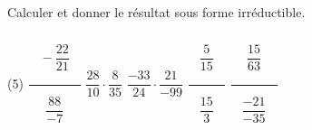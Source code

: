 \documentclass[a4paper,12pt]{report}
\begin{document}
\begin{auto}Calculer et donner le résultat sous forme irréductible.

\begin{tasks}(5)
	\task $\dfrac{\phantom{\dfrac{(_(^(}{(_(^(}}-\dfrac{22}{21}\phantom{\dfrac{(_(^(}{(_(^(}}}{\phantom{\dfrac{(_(^(}{(_(^(}}\dfrac{88}{-7}\phantom{\dfrac{(_(^(}{(_(^(}}}$
	\task $\dfrac{28}{10}\cdot\dfrac{8}{35}$
	\task $\dfrac{-33}{24}\cdot\dfrac{21}{-99}$
	\task $\dfrac{\phantom{\dfrac{(_(^(}{(_(^(}}\dfrac{5}{15}\phantom{\dfrac{(_(^(}{(_(^(}}}{\phantom{\dfrac{(_(^(}{(_(^(}}\dfrac{15}{3}\phantom{\dfrac{(_(^(}{(_(^(}}}$
	\task $\dfrac{\phantom{\dfrac{(_(^(}{(_(^(}}\dfrac{15}{63}\phantom{\dfrac{(_(^(}{(_(^(}}}{\phantom{\dfrac{(_(^(}{(_(^(}}\dfrac{-21}{-35}\phantom{\dfrac{(_(^(}{(_(^(}}}$
\end{tasks}
\end{auto}
\end{document}
